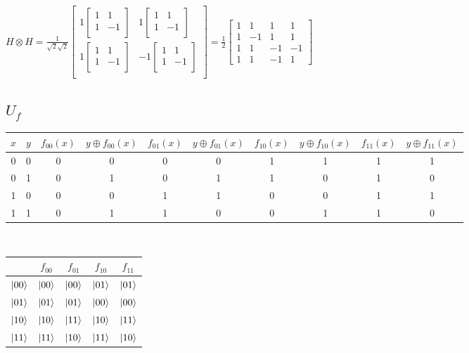 \documentclass{iansnotes}
\begin{document}
$H \otimes H = \frac{1}{\sqrt{2}\sqrt{2}} \begin{bmatrix}
  1 \begin{bmatrix} 1 & 1 \\ 1 & -1 \\ \end{bmatrix} & 1 \begin{bmatrix} 1 & 1 \\ 1 & -1 \\ \end{bmatrix} \\[5mm]
  1 \begin{bmatrix} 1 & 1 \\ 1 & -1 \\ \end{bmatrix} & -1 \begin{bmatrix} 1 & 1 \\ 1 & -1 \\ \end{bmatrix} \\
\end{bmatrix} = \frac{1}{2} \begin{bmatrix} 1 & 1 & 1 & 1 \\ 1 & -1 & 1 & 1 \\ 1 & 1 & -1 & -1 \\ 1 & 1 & -1 & 1 \end{bmatrix}$



\subsection{$U_f$}
{\footnotesize
\begin{tabular}{cc|cc|cc|cc|cc}
  $x$ & $y$ & $f_{00}(x)$ & $y \oplus f_{00}(x)$ & $f_{01}(x)$ & $y \oplus f_{01}(x)$ & $f_{10}(x)$ & $y \oplus f_{10}(x)$& $f_{11}(x)$ & $y \oplus f_{11}(x)$ \\
  \midrule
  0 & 0 & 0 & 0 & 0 & 0 & 1 & 1 & 1 & 1 \\
  0 & 1 & 0 & 1 & 0 & 1 & 1 & 0 & 1 & 0 \\
  1 & 0 & 0 & 0 & 1 & 1 & 0 & 0 & 1 & 1 \\
  1 & 1 & 0 & 1 & 1 & 0 & 0 & 1 & 1 & 0 \\
\end{tabular}} \\[12mm]
\noindent \begin{tabular}{c|cccc}
           & $f_{00}$ & $f_{01}$ & $f_{10}$ & $f_{11}$ \\
  \midrule
  $\ket{00}$ & $\ket{00}$ & $\ket{00}$ & $\ket{01}$ & $\ket{01}$ \\
  $\ket{01}$ & $\ket{01}$ & $\ket{01}$ & $\ket{00}$ & $\ket{00}$ \\
  $\ket{10}$ & $\ket{10}$ & $\ket{11}$ & $\ket{10}$ & $\ket{11}$ \\
  $\ket{11}$ & $\ket{11}$ & $\ket{10}$ & $\ket{11}$ & $\ket{10}$ \\ 
\end{tabular}\\[16mm]
\end{document}
